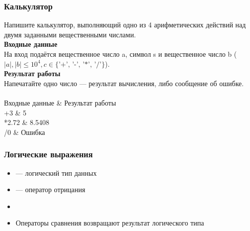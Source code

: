 \documentclass[PDF,10pt,usenames,dvipsnames,t,fragile]{beamer}
\newcommand{\inp}{\\ \vspace{5pt} {\bf Входные данные} \\ \vspace{5pt}} %
\newcommand{\out}{\\ \vspace{5pt} {\bf Результат работы} \\ \vspace{5pt}} %
\newcommand{\tb}{\\ \hline} %
\newenvironment{ex}{\\ \vspace{5pt}{\bf Пример} \\
\tabularx{\textwidth}{|X|X|}
\hline Входные данные & Результат работы \tb}{\endtabularx}
\begin{document}
\begin{frame}
	\frametitle{Калькулятор}
	Напишите калькулятор, выполняющий одно из 4 арифметических действий над двумя заданными вещественными числами.
	\inp
	На вход подаётся вещественное число a, символ s и вещественное число b ($|a|,|b| \leq 10^4, c \in \{\text{'+', '-', '*', '/'}\}$).
	\out
	Напечатайте одно число --- результат вычисления, либо сообщение об ошибке.
	\begin{ex}
	2+3 & 5 \tb
	3.14*2.72 & 8.5408 \tb
	42/0 & Ошибка \tb
	\end{ex}
\end{frame}

\begin{frame}
	\frametitle{Логические выражения}
	\begin{itemize}
		\item {} --- логический тип данных
		\item \lcode{!} --- оператор отрицания
		\item {}
		\item Операторы сравнения возвращают результат логического типа
	\end{itemize}
\end{frame}
\end{document}
